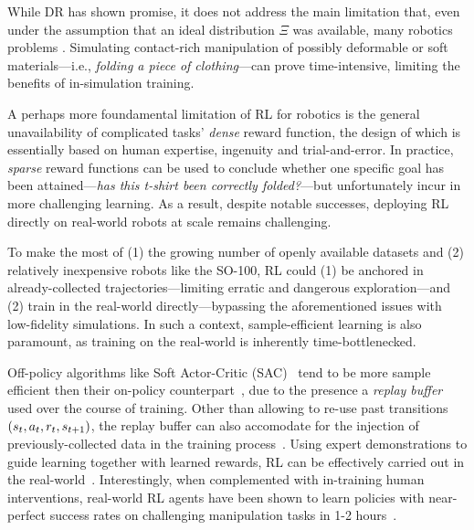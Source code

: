 While DR has shown promise, it does not address the main limitation that, even under the assumption that an ideal distribution \( \Xi \) was available, many robotics problems .
Simulating contact-rich manipulation of possibly deformable or soft materials---i.e., \emph{folding a piece of clothing}---can prove time-intensive, limiting the benefits of in-simulation training.

A perhaps more foundamental limitation of RL for robotics is the general unavailability of complicated tasks' \emph{dense} reward function, the design of which is essentially based on human expertise, ingenuity and trial-and-error.
In practice, \emph{sparse} reward functions can be used to conclude whether one specific goal has been attained---\emph{has this t-shirt been correctly folded?}---but unfortunately incur in more challenging learning.
As a result, despite notable successes, deploying RL directly on real-world robots at scale remains challenging.

To make the most of (1) the growing number of openly available datasets and (2) relatively inexpensive robots like the SO-100, RL could (1) be anchored in already-collected trajectories---limiting erratic and dangerous exploration---and (2) train in the real-world directly---bypassing the aforementioned issues with low-fidelity simulations.
In such a context, sample-efficient learning is also paramount, as training on the real-world is inherently time-bottlenecked.

Off-policy algorithms like Soft Actor-Critic (SAC)~\citep{haarnojaSoftActorCriticOffPolicy2018} tend to be more sample efficient then their on-policy counterpart~\citep{schulmanProximalPolicyOptimization2017}, due to the presence a \emph{replay buffer} used over the course of training.
Other than allowing to re-use past transitions \( (s_t, a_t, r_t, s_{t+1}) \), the replay buffer can also accomodate for the injection of previously-collected data in the training process~\citep{ballEfficientOnlineReinforcement2023}.
Using expert demonstrations to guide learning together with learned rewards, RL can be effectively carried out in the real-world~\citep{luoSERLSoftwareSuite2025}.
Interestingly, when complemented with in-training human interventions, real-world RL agents have been shown to learn policies with near-perfect success rates on challenging manipulation tasks in 1-2 hours~\citep{luoPreciseDexterousRobotic2024}.

